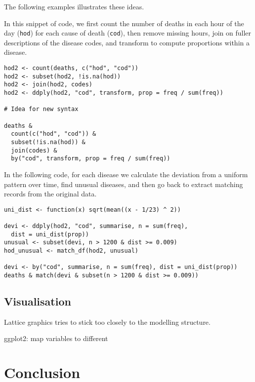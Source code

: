 \documentclass[oneside]{article}
\begin{document}
The following examples illustrates these ideas.  

In this snippet of code, we first count the number of deaths in each hour of the day (\texttt{hod}) for each cause of death (\texttt{cod}), then remove missing hours, join on fuller descriptions of the disease codes, and transform to compute proportions within a disease.

\begin{verbatim}
hod2 <- count(deaths, c("hod", "cod"))
hod2 <- subset(hod2, !is.na(hod))
hod2 <- join(hod2, codes)
hod2 <- ddply(hod2, "cod", transform, prop = freq / sum(freq))

# Idea for new syntax

deaths &
  count(c("hod", "cod")) &
  subset(!is.na(hod)) &
  join(codes) &
  by("cod", transform, prop = freq / sum(freq))
\end{verbatim}

In the following code, for each disease we calculate the deviation from a uniform pattern over time, find unusual diseases, and then go back to extract matching records from the original data.

\begin{verbatim}
uni_dist <- function(x) sqrt(mean((x - 1/23) ^ 2))

devi <- ddply(hod2, "cod", summarise, n = sum(freq), 
  dist = uni_dist(prop))
unusual <- subset(devi, n > 1200 & dist >= 0.009)
hod_unusual <- match_df(hod2, unusual)

devi <- by("cod", summarise, n = sum(freq), dist = uni_dist(prop))
deaths & match(devi & subset(n > 1200 & dist >= 0.009))
\end{verbatim}

\subsection{Visualisation}

Lattice graphics tries to stick too closely to the modelling structure.

ggplot2: map variables to different 

\section{Conclusion}


\end{document}
